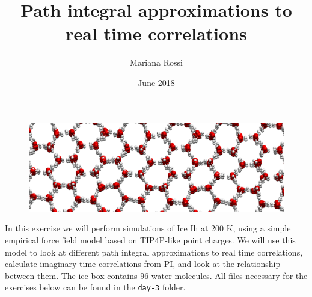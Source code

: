 \documentclass{article}
\title{Path integral approximations to real time correlations}
\author{Mariana Rossi}
\date{June 2018}
\begin{document}
\maketitle

\begin{figure}[ht]
\centering
\includegraphics[width=\textwidth]{ice.png}
\end{figure}

In this exercise we will perform
simulations of Ice Ih at 200 K,
using a simple empirical force field model based
on TIP4P-like point charges. We will use this model to look
at different path integral approximations to real time correlations, calculate imaginary
time correlations from PI, and look at the relationship between them. The ice box contains 96 water molecules.
All files necessary for the exercises below can be found in the \texttt{day-3} folder.




\end{document}
